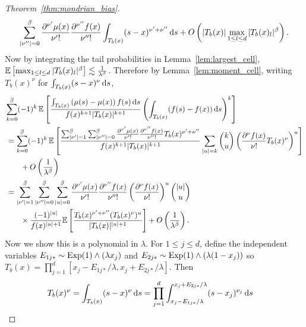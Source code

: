 \begin{proof}[Theorem~\ref{thm:mondrian_bias}]
\begin{align*}
    \sum_{|\nu''|=0}^{\flbeta}
    \frac{\partial^{\nu'} \mu(x)}{\nu' !}
    \frac{\partial^{\nu''} f(x)}{\nu'' !}
    \int_{T_b(x)} (s-x)^{\nu' + \nu''} \diff s
    + O \left( |T_b(x)| \max_{1 \leq l \leq d} |T_b(x)_l|^\beta \right).
  \end{align*}
  Now by integrating the tail probabilities in Lemma~\ref{lem:largest_cell},
  $ \mathbb{E} \left[ \max_{1 \leq l \leq d} |T_b(x)_l|^\beta \right]
  \lesssim \frac{1}{\lambda^\beta}$.
  Therefore by Lemma~\ref{lem:moment_cell},
  writing $T_b(x)^\nu$ for $\int_{T_b(x)} (s-x)^\nu \,\mathrm{d}s$,
  \begin{align*}
    &\sum_{k=0}^{\flbeta}
    (-1)^k \,
    \E \left[
      \frac{\int_{T_b(x)} \left( \mu(s) - \mu(x) \right) f(s) \diff s}
      {f(x)^{k+1} |T_b(x)|^{k+1}}
      \left(
        \int_{T_b(x)} (f(s) - f(x)) \diff s
      \right)^k
    \right] \\
    &\,=
    \sum_{k=0}^{\flbeta}
    (-1)^k \,
    \E
    \left[
      \frac{
        \sum_{|\nu'|=1}^{\flbeta}
        \sum_{|\nu''|=0}^{\flbeta}
        \frac{\partial^{\nu'} \mu(x)}{\nu' !}
        \frac{\partial^{\nu''} f(x)}{\nu'' !}
        T_b(x)^{\nu' + \nu''}
      }{f(x)^{k+1} |T_b(x)|^{k+1}}
      \sum_{|u| = k}
      \binom{k}{u}
      \left(
        \frac{\partial^\nu f(x)}{\nu !}
        T_b(x)^\nu
      \right)^u
    \right] \\
    &\qquad+
    O \left(
      \frac{1}{\lambda^\beta}
    \right) \\
    &\,=
    \sum_{|\nu'|=1}^{\flbeta}
    \sum_{|\nu''|=0}^{\flbeta}
    \sum_{|u|=0}^{\flbeta}
    \frac{\partial^{\nu'} \mu(x)}{\nu' !}
    \frac{\partial^{\nu''} f(x)}{\nu'' !}
    \left( \frac{\partial^\nu f(x)}{\nu !} \right)^u
    \binom{|u|}{u} \\
    &\qquad\times
    \frac{(-1)^{|u|}}{f(x)^{|u|+1}}
    \E \left[
      \frac{ T_b(x)^{\nu' + \nu''} (T_b(x)^\nu)^u}{|T_b(x)|^{|u|+1}}
    \right]
    + O \left(
      \frac{1}{\lambda^\beta}
    \right) .
  \end{align*}
  Now we show this is a polynomial in $\lambda$.
  For $1 \leq j \leq d$, define the independent variables
  $E_{1j*} \sim \operatorname{Exp}(1) \wedge (\lambda x_j)$
  and $E_{2j*} \sim \operatorname{Exp}(1) \wedge (\lambda (1-x_j))$
  so
  $T_b(x) = \prod_{j=1}^{d} [x_j - E_{1j*} / \lambda, x_j + E_{2j*} / \lambda]$.
  Then
  \begin{align*}
    T_b(x)^\nu
    &=
    \int_{T_b(x)} (s-x)^\nu \diff s
    = \prod_{j=1}^d
    \int_{x_j - E_{1j*}/\lambda}^{x_j+E_{2j*}/\lambda}
    (s - x_j)^{\nu_j} \diff s

\end{align*}
\end{proof}
